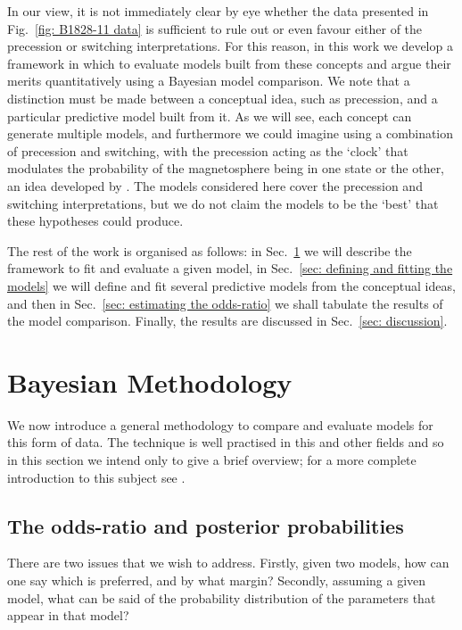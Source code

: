 \documentclass[../full_thesis/full_thesis.tex]{subfiles}
\begin{document}
In our view, it is not immediately clear by eye whether the data presented in
Fig.~\ref{fig: B1828-11 data} is sufficient to rule out or even favour either
of the precession or switching interpretations.  For this reason, in this work
we develop a framework in which to evaluate models built from these concepts
and argue their merits quantitatively using a Bayesian model comparison. We
note that a distinction must be made between a conceptual idea, such as
precession, and a particular predictive model built from it. As we will see,
each concept can generate multiple models, and furthermore we could imagine
using a combination of precession and switching,  with the precession acting as
the `clock' that modulates the probability of the magnetosphere being in one
state or the other, an idea developed by  \citet{Jones2012}. The models
considered here cover the precession and switching interpretations, but we do
not claim the models to be the `best' that these hypotheses could produce.

The rest of the work is organised as follows: in Sec.~\ref{sec: methodology} we
will describe the framework to fit and evaluate a given model, in
Sec.~\ref{sec: defining and fitting the models} we will define and fit several
predictive models from the conceptual ideas, and then in Sec.~\ref{sec:
estimating the odds-ratio} we shall tabulate the results of the model
comparison. Finally, the results are discussed in Sec.~\ref{sec: discussion}.





\section{ Bayesian Methodology}
\label{sec: methodology}
We now introduce a general methodology to compare and evaluate models for this
form of data. The technique is well practised in this and other fields and so
in this section we intend only to give a brief overview; for a more complete
introduction to this subject see \cite{jaynes2003probability,
gelman2013bayesian, sivia1996data}.

\subsection{The odds-ratio and posterior probabilities}

There are two issues that we wish to address.  Firstly, given two models, how
can one say which is preferred, and by what margin?  Secondly, assuming a given
model, what can be said of the probability distribution of the
parameters that appear in that model?
\end{document}
